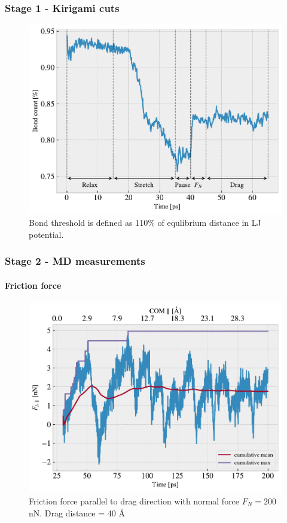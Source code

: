\documentclass[
	10pt, %
]{beamer}
\begin{document}
\begin{frame}
	\frametitle{Stage 1 - Kirigami cuts}



	\begin{figure}
		\includegraphics[width=0.7\linewidth]{figures/contact_pct.pdf}
		\caption{Bond threshold is defined as 110\% of equlibrium distance in LJ potential.}
	\end{figure}	

	
\end{frame}



\begin{frame}
	\frametitle{Stage 2 - MD measurements}
	\framesubtitle{Friction force}

	
	\begin{figure}
		\includegraphics[width=0.7\linewidth]{figures/drag1.pdf}
		\caption{Friction force parallel to drag direction with normal force $F_N = 200$ nN. Drag distance = 40 Å}
	\end{figure}	
	
\end{frame}
\end{document}
